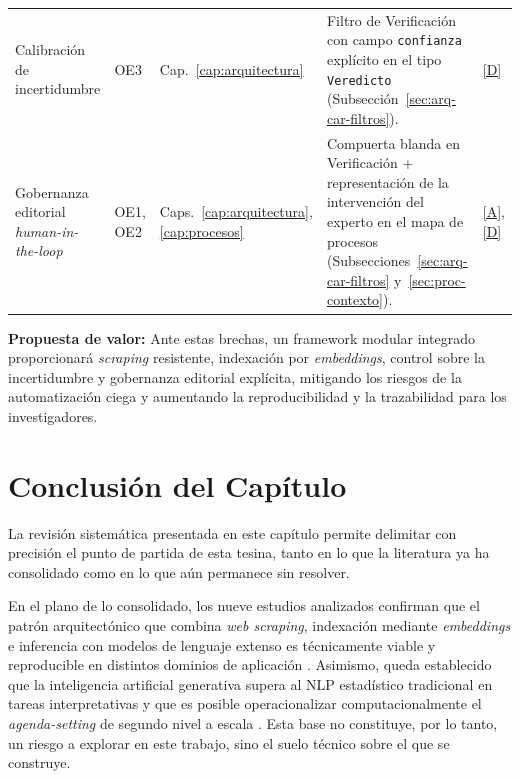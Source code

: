 \documentclass[12pt]{report}
\DeclareRobustCommand{\resp}[1]{\hyperref[tab:registro-responsabilidades]{\textcolor{respcolor}{[#1]}}}
\begin{document}
\begin{table}[H]
\begin{tabularx}{\textwidth}{@{}>{\raggedright\arraybackslash}p{3.2cm} l l X l@{}}
    \addlinespace
    Calibración de incertidumbre
                    & OE3                                                                                                                                                                         & Cap.~\ref{cap:arquitectura}
                    & Filtro de Verificación con campo \texttt{confianza} explícito en el tipo \texttt{Veredicto} (Subsección~\ref{sec:arq-car-filtros}).                                         & \resp{D}                                                                                           \\
    \addlinespace
    Gobernanza editorial \textit{human-in-the-loop}
                    & OE1, OE2                                                                                                                                                                    & Caps.~\ref{cap:arquitectura}, \ref{cap:procesos}
                    & Compuerta blanda en Verificación + representación de la intervención del experto en el mapa de procesos (Subsecciones~\ref{sec:arq-car-filtros} y~\ref{sec:proc-contexto}). & \resp{A}, \resp{D}                                                                                 \\
    \bottomrule
  \end{tabularx}
\end{table}

\textbf{Propuesta de valor:} Ante estas brechas, un framework modular integrado proporcionará \textit{scraping} resistente, indexación por \textit{embeddings}, control sobre la incertidumbre y gobernanza editorial explícita, mitigando los riesgos de la automatización ciega y aumentando la reproducibilidad y la trazabilidad para los investigadores.

\section{Conclusión del Capítulo}
\label{sec:rsl-conclusion}
La revisión sistemática presentada en este capítulo permite delimitar con precisión el punto de partida de esta tesina, tanto en lo que la literatura ya ha consolidado como en lo que aún permanece sin resolver.

En el plano de lo consolidado, los nueve estudios analizados confirman que el patrón arquitectónico que combina \textit{web scraping}, indexación mediante \textit{embeddings} e inferencia con modelos de lenguaje extenso es técnicamente viable y reproducible en distintos dominios de aplicación \citep{behbahanian, neupane2025, somasundharam:2025}. Asimismo, queda establecido que la inteligencia artificial generativa supera al NLP estadístico tradicional en tareas interpretativas \citep{milbauer2023, pavlyshenko2024} y que es posible operacionalizar computacionalmente el \textit{agenda-setting} de segundo nivel a escala \citep{haider2025, samuel2025}. Esta base no constituye, por lo tanto, un riesgo a explorar en este trabajo, sino el suelo técnico sobre el que se construye.
\end{document}
